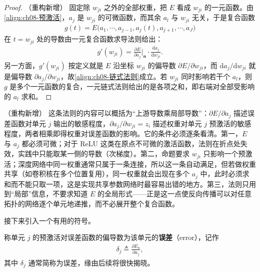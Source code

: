 \documentclass[../../main.tex]{subfiles}
\begin{document}
\begin{proof}（重构新增）
固定除 $w_{ji}$ 之外的全部权重，把 $E$ 看成 $w_{ji}$ 的一元函数。由\eqref{align:ch08-预激活}，$a_j$ 是 $w_{ji}$ 的可微函数，而其余 $a_l$ 与 $w_{ji}$ 无关，于是复合函数
\begin{align*}
g(t)=E\bigl(a_1,\cdots,a_{j-1},a_j(t),a_{j+1},\cdots,a_J\bigr)
\end{align*}
在 $t=w_{ji}$ 处的导数由一元复合函数求导法则给出：
\begin{align*}
g'(w_{ji})=\frac{\partial E}{\partial a_j}\Big|_{\mathbf{a}}\cdot\frac{\mathrm{d}a_j}{\mathrm{d}w_{ji}}.
\end{align*}
另一方面，$g'(w_{ji})$ 按定义就是 $E$ 沿坐标 $w_{ji}$ 的偏导数 $\partial E/\partial w_{ji}$，而 $\mathrm{d}a_j/\mathrm{d}w_{ji}$ 就是偏导数 $\partial a_j/\partial w_{ji}$，故\eqref{align:ch08-链式法则}成立。若 $w_{ji}$ 同时影响若干个 $a_l$，则 $g$ 是多个一元函数的复合，一元链式法则给出的是各项之和，即右端对全部受影响的 $a_l$ 求和。
\end{proof}

\begin{remark}（重构新增）
这条法则的内容可以概括为“上游导数乘局部导数”：$\partial E/\partial a_j$ 描述误差函数对单元 $j$ 输出的敏感程度，$\partial a_j/\partial w_{ji}=z_i$ 描述权重对单元 $j$ 预激活的敏感程度，两者相乘即得权重对误差函数的影响。它的条件必须逐条看清。第一，$E$ 与 $a_j$ 都必须可微；对于 ReLU 这类在原点不可微的激活函数，法则在折点处失效，实践中只能取某一侧的导数（次梯度）。第二，命题要求 $w_{ji}$ 只影响一个预激活；深度网络中同一权重通常只属于一条连接，所以这一条自动满足，但若做权重共享（如卷积核在多个位置复用），同一权重就会出现在多个 $a_j$ 中，此时必须求和而不能只取一项，这是实现共享参数网络时最容易出错的地方。第三，法则只用到“局部”信息，不要求知道 $E$ 的全局形式——正是这一点使反向传播可以对任意拓扑的网络逐个单元地递推，而不必展开整个复合函数。
\end{remark}

接下来引入一个有用的符号。

\begin{definition}[误差项]\label{definition:ch08-误差项}
称单元 $j$ 的预激活对误差函数的偏导数为该单元的\textbf{误差}（error），记作
\begin{align}
\delta_j\triangleq\frac{\partial E_n}{\partial a_j},
\label{align:ch08-误差}
\end{align}
其中 $\delta_j$ 通常简称为误差，缘由后续将很快揭晓。
\end{definition}
\end{document}
